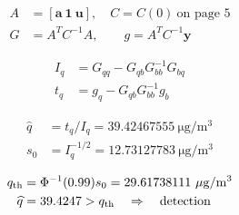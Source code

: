 \documentclass{article}
\begin{document}
\newpage
\[\displaystyle \begin{aligned}A&=[\mathbf a\ \mathbf1\ \mathbf u],\quad C=C(0)\ \text{on page 5}\\G&=A^TC^{-1}A,\qquad g=A^TC^{-1}\mathbf y\end{aligned}\]

\newpage
\[\displaystyle \begin{aligned}I_q&=G_{qq}-G_{qb}G_{bb}^{-1}G_{bq}\\t_q&=g_q-G_{qb}G_{bb}^{-1}g_b\end{aligned}\]

\newpage
\[\displaystyle \begin{aligned}\widehat q&=t_q/I_q=39.42467555\ \mathrm{\mu g/m^3}\\s_0&=I_q^{-1/2}=12.73127783\ \mathrm{\mu g/m^3}\end{aligned}\]

\newpage
\[\displaystyle \begin{aligned}q_{\rm th}&=\Phi^{-1}(0.99)s_0=29.61738111\ \mathrm{\mu g/m^3}\\\widehat q&=39.4247>q_{\rm th}\quad\Rightarrow\quad\text{detection}\end{aligned}\]
\end{document}

